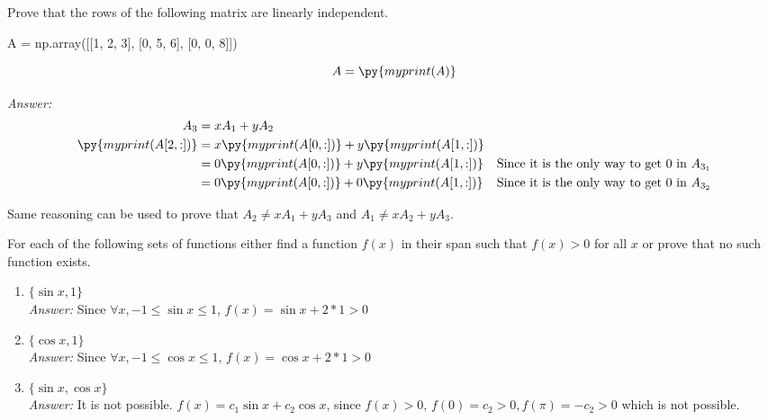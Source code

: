 \documentclass[letter]{article}
\newcommand{\ans}{\textit{Answer: }}
\newenvironment{question}[2][Question]{\begin{trivlist}
\item[\hskip \labelsep {\bfseries #1}\hskip \labelsep {\bfseries #2.}]}{\end{trivlist}}
\begin{document}
\begin{question}{1.10}
  Prove that the rows of the following matrix are linearly independent. 
  \begin{pycode}
A = np.array([[1, 2, 3], [0, 5, 6], [0, 0, 8]])
  \end{pycode}

  $$A = \py{myprint(A)}$$

  \ans 
  \begin{align*}
    A_3 &= xA_1 + yA_2 \\
    \py{myprint(A[2, :])} &= x\py{myprint(A[0, :])} + y\py{myprint(A[1, :])} \\
      &= 0 \py{myprint(A[0, :])} + y \py{myprint(A[1, :])} & \text{Since it is the only way to get 0 in } A_{3_1} \\ 
      &= 0 \py{myprint(A[0, :])} + 0 \py{myprint(A[1, :])} & \text{Since it is the only way to get 0 in } A_{3_2}
  \end{align*}

  Same reasoning can be used to prove that $A_2 \neq xA_1 + yA_3$ and $A_1 \neq xA_2 + yA_3$.
\end{question}

\begin{question}{1.19}
  For each of the following sets of functions either find a function $f (x)$ in their
  span such that $f (x) > 0$ for all $x$ or prove that no such function exists.

  \begin{enumerate}[label=\alph*]
    \item $\{\sin{x}, 1\}$ \\
    \ans Since $\forall x, -1 \leq \sin{x} \leq 1$, $f(x) = \sin{x} + 2 * 1 > 0$ 

    \item $\{\cos{x}, 1\}$ \\
    \ans Since $\forall x, -1 \leq \cos{x} \leq 1$, $f(x) = \cos{x} + 2 * 1 > 0$ 

    \item $\{\sin{x}, \cos{x}\}$ \\
    \ans It is not possible. $f(x) = c_1 \sin{x} + c_2 \cos{x}$, since $f(x) > 0$, 
    $f(0) = c_2 > 0, f(\pi) = -c_2 > 0$ which is not possible. 
  \end{enumerate}
  
\end{question}
\end{document}
